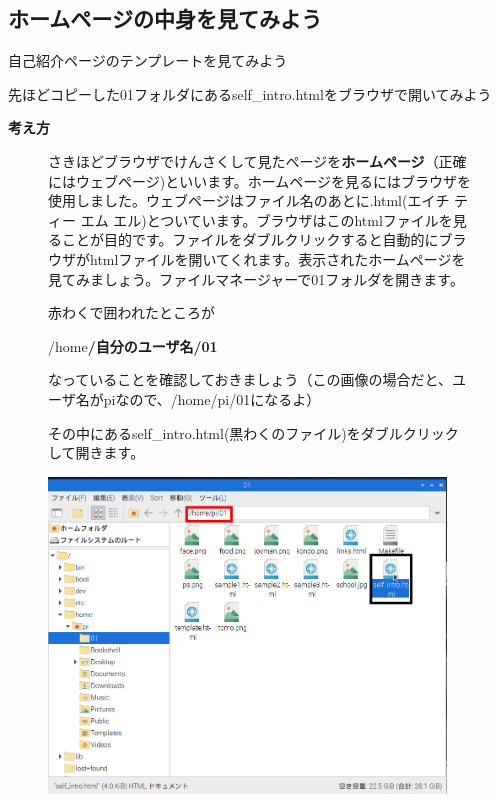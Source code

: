 \documentclass[a4paper,12pt]{jarticle}
\begin{document}
\bigskip

\clearpage
{}
\subsection{\theExercise ホームページの中身を見てみよう}
自己紹介ページのテンプレートを見てみよう

先ほどコピーした01フォルダにあるself\_intro.htmlをブラウザで開いてみよう

\textbf{考え方}



\begin{figure}[hb]
  \centering
  \begin{minipage}{16.576cm}
    さきほどブラウザでけんさくして見たページを\textbf{ホームページ}（正確にはウェブページ)といいます。ホームページを見るにはブラウザを使用しました。ウェブページはファイル名のあとに.html(エイチ
    ティー エム
    エル)とついています。ブラウザはこのhtmlファイルを見ることが目的です。ファイルをダブルクリックすると自動的にブラウザがhtmlファイルを開いてくれます。表示されたホームページを見てみましょう。ファイルマネージャーで01フォルダを開きます。

    赤わくで囲われたところが

    /home\textbf{/自分のユーザ名/01}

    なっていることを確認しておきましょう（この画像の場合だと、ユーザ名がpiなので、/home/pi/01になるよ）

    その中にあるself\_intro.html(黒わくのファイル)をダブルクリックして開きます。




    \bigskip
  \end{minipage}

  \includegraphics[width=10.559cm]{textbook-img141.png}

\end{figure}
\end{document}
